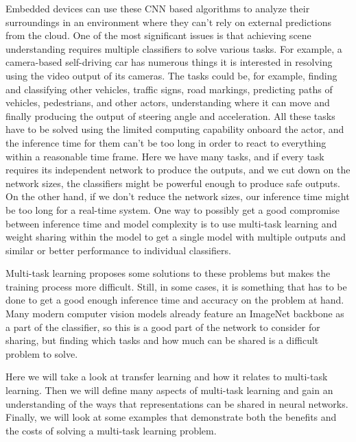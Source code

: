 Embedded devices can use these CNN based algorithms to analyze their surroundings in an environment where they can't rely on external predictions from the cloud. One of the most significant issues is that achieving scene understanding requires multiple classifiers to solve various tasks. For example, a camera-based self-driving car has numerous things it is interested in resolving using the video output of its cameras. The tasks could be, for example, finding and classifying other vehicles, traffic signs, road markings, predicting paths of vehicles, pedestrians, and other actors, understanding where it can move and finally producing the output of steering angle and acceleration. All these tasks have to be solved using the limited computing capability onboard the actor, and the inference time for them can't be too long in order to react to everything within a reasonable time frame. Here we have many tasks, and if every task requires its independent network to produce the outputs, and we cut down on the network sizes, the classifiers might be powerful enough to produce safe outputs. On the other hand, if we don't reduce the network sizes, our inference time might be too long for a real-time system. One way to possibly get a good compromise between inference time and model complexity is to use multi-task learning and weight sharing within the model to get a single model with multiple outputs and similar or better performance to individual classifiers.

Multi-task learning proposes some solutions to these problems but makes the training process more difficult. Still, in some cases, it is something that has to be done to get a good enough inference time and accuracy on the problem at hand. Many modern computer vision models already feature an ImageNet backbone as a part of the classifier, so this is a good part of the network to consider for sharing, but finding which tasks and how much can be shared is a difficult problem to solve.

Here we will take a look at transfer learning and how it relates to multi-task learning.
Then we will define many aspects of multi-task learning and gain an understanding of the ways that representations can be shared in neural networks.
Finally, we will look at some examples that demonstrate both the benefits and the costs of solving a multi-task learning problem.
